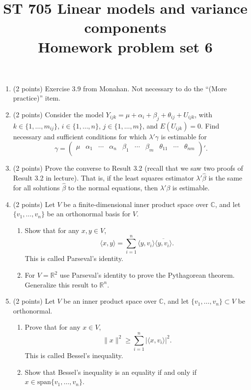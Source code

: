 \documentclass[11pt]{article}
\title{ST 705 Linear models and variance components \\ 
        Homework problem set 6}
\begin{document}
\maketitle

\begin{enumerate}

\item(2 points) Exercise 3.9 from Monahan.  Not necessary to do the ``(More practice)'' item. 

\item(2 points) Consider the model $Y_{ijk} = \mu + \alpha_{i} + \beta_{j} + \theta_{ij} + U_{ijk}$, with $k \in \{1,\dots,m_{ij}\}$, $i \in \{1,\dots,n\}$, $j \in \{1,\dots,m\}$, and $E(U_{ijk}) = 0$.  Find necessary and sufficient conditions for which $\lambda'\gamma$ is estimable for 
\[
\gamma =
\begin{pmatrix}
\mu & \alpha_{1} & \cdots & \alpha_{n} & \beta_{1} & \cdots & \beta_{m} & \theta_{11} & \cdots & \theta_{nm} \\
\end{pmatrix}'.
\]

\item(2 points) Prove the converse to Result 3.2 (recall that we saw two proofs of Result 3.2 in lecture).  That is, if the least squares estimator $\lambda'\widehat{\beta}$ is the same for all solutions $\widehat{\beta}$ to the normal equations, then $\lambda'\beta$ is estimable. 

\item(2 points) Let $V$ be a finite-dimensional inner product space over $\mathbb{C}$, and let $\{v_{1},\dots,v_{n}\}$ be an orthonormal basis for $V$.  
\begin{enumerate}
\item Show that for any $x,y \in V$,
\[
\langle x,y\rangle = \sum_{i=1}^{n}\langle y,v_{i} \rangle\overline{\langle y,v_{i} \rangle}.
\]
This is called Parseval's identity.
\item For $V = \mathbb{R}^{2}$ use Parseval's identity to prove the Pythagorean theorem.  Generalize this result to $\mathbb{R}^{n}$.
\end{enumerate}

\item(2 points) Let $V$ be an inner product space over $\mathbb{C}$, and let $\{v_{1},\dots,v_{n}\} \subset V$ be orthonormal.
\begin{enumerate}
\item Prove that for any $x \in V$,
\[
\|x\|^{2} \ge \sum_{i=1}^{n} |\langle x,v_{i}\rangle|^{2}.
\]
This is called Bessel's inequality.
\item Show that Bessel's inequality is an equality if and only if $x \in \text{span}\{v_{1},\dots,v_{n}\}$.
\end{enumerate}  

\end{enumerate}
\end{document}
